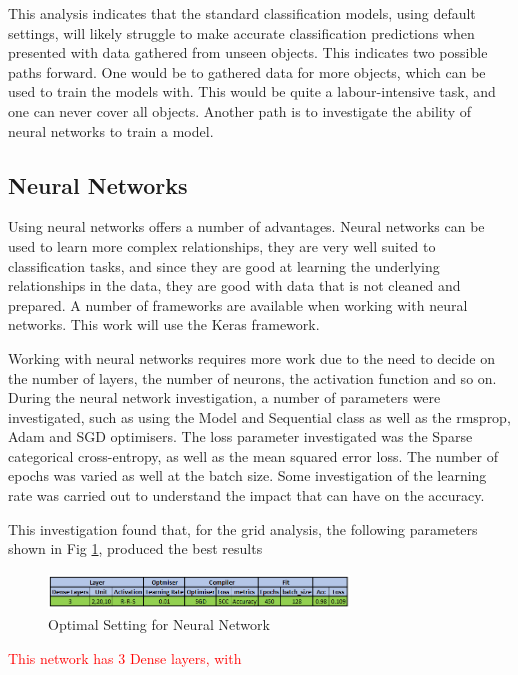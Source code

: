 \documentclass[conference]{IEEEtran}
\begin{document}
This analysis indicates that the standard classification models, using default settings, will likely struggle to make accurate classification predictions when presented with data gathered from unseen objects. This indicates two possible paths forward. One would be to gathered data for more objects, which can be used to train the models with. This would be quite a labour-intensive task, and one can never cover all objects. Another path is to investigate the ability of neural networks to train a model. 

\subsection{Neural Networks}
Using neural networks offers a number of advantages. Neural networks can be used to learn more complex relationships, they are very well suited to classification tasks, and since they are good at learning the underlying relationships in the data, they are good with data that is not cleaned and prepared. A number of frameworks are available when working with neural networks. This work will use the Keras framework.

Working with neural networks requires more work due to the need to decide on the number of layers, the number of neurons, the activation function and so on. During the neural network investigation, a number of parameters were investigated, such as using the Model and Sequential class as well as the rmsprop, Adam and SGD optimisers. The loss parameter investigated was the Sparse categorical cross-entropy, as well as the mean squared error loss. The number of epochs was varied as well at the batch size. Some investigation of the learning rate was carried out to understand the impact that can have on the accuracy. 

This investigation found that, for the grid analysis, the following parameters shown in Fig \ref{fig:nn_settings}, produced the best results

\begin{figure}[h]
\includegraphics[width=8cm, height=1cm]{images/nn_settings.png}
\centering
\caption{Optimal Setting for Neural Network}
\label{fig:nn_settings}
\end{figure}

\textcolor{red}{This network has 3 Dense layers, with }
\end{document}
